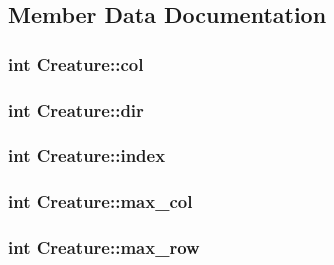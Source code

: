\subsection{Member Data Documentation}
\hypertarget{classCreature_a0c3719e1305f2667b08addeec7bc59d2}{
\subsubsection[{col}]{\setlength{\rightskip}{0pt plus 5cm}int Creature\-::col\hspace{0.3cm}{\ttfamily [private]}}}\label{classCreature_a0c3719e1305f2667b08addeec7bc59d2}
\hypertarget{classCreature_affc8d6b2f849b1bc3199c459151f8ce7}{
\subsubsection[{dir}]{\setlength{\rightskip}{0pt plus 5cm}int Creature\-::dir\hspace{0.3cm}{\ttfamily [private]}}}\label{classCreature_affc8d6b2f849b1bc3199c459151f8ce7}
\hypertarget{classCreature_adab2dc50d1556d82299c3dd3db9597f8}{
\subsubsection[{index}]{\setlength{\rightskip}{0pt plus 5cm}int Creature\-::index\hspace{0.3cm}{\ttfamily [private]}}}\label{classCreature_adab2dc50d1556d82299c3dd3db9597f8}
\hypertarget{classCreature_aa3962eff5df61b979613c35e3ae750fd}{
\subsubsection[{max\-\_\-col}]{\setlength{\rightskip}{0pt plus 5cm}int Creature\-::max\-\_\-col\hspace{0.3cm}{\ttfamily [private]}}}\label{classCreature_aa3962eff5df61b979613c35e3ae750fd}
\hypertarget{classCreature_a6faf65ef350cd117d9d6390601ff85c3}{
\subsubsection[{max\-\_\-row}]{\setlength{\rightskip}{0pt plus 5cm}int Creature\-::max\-\_\-row\hspace{0.3cm}{\ttfamily [private]}}}\label{classCreature_a6faf65ef350cd117d9d6390601ff85c3}
